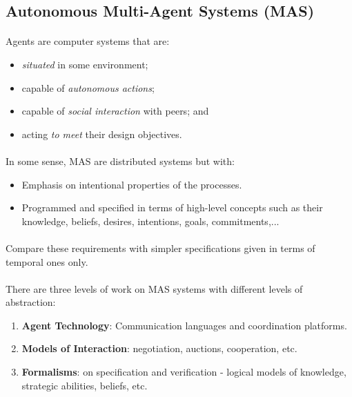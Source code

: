 \documentclass{article}
\theoremstyle{plain}
\theoremstyle{definition}
\begin{document}
\begin{multicols}{2}
\subsection{Autonomous Multi-Agent Systems (MAS)}

\paragraph{} Agents are computer systems that are:

\begin{itemize}
\item \textit{situated} in some environment;
\item capable of \textit{autonomous actions};
\item capable of \textit{social interaction} with peers; and
\item acting \textit{to meet} their design objectives.
\end{itemize}

\paragraph{} In some sense, MAS are distributed systems but with:

\begin{itemize}
\item Emphasis on intentional properties of the processes.
\item Programmed and specified in terms of high-level concepts such as their knowledge, beliefs, desires, intentions, goals, commitments,...
\end{itemize}

\paragraph{} Compare these requirements with simpler specifications given in terms of temporal ones only.

\paragraph{} There are three levels of work on MAS systems with different levels of abstraction:

\begin{enumerate}
\item \textbf{Agent Technology}: Communication languages and coordination platforms.
\item \textbf{Models of Interaction}: negotiation, auctions, cooperation, etc.
\item \textbf{Formalisms}: on specification and verification - logical models of knowledge, strategic abilities, beliefs, etc.
\end{enumerate}


\end{multicols}
\end{document}
